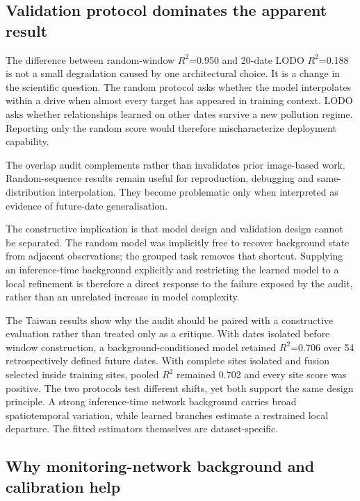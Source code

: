 \documentclass[review,12pt,authoryear]{elsarticle}
\newcommand{\Rtwo}{\ensuremath{R^2}}
\begin{document}
\subsection{Validation protocol dominates the apparent result}

The difference between random-window \Rtwo=0.950 and 20-date LODO
\Rtwo=0.188 is not a small degradation caused by one architectural choice. It
is a change in the scientific question. The random protocol asks whether the
model interpolates within a drive when almost every target has appeared in
training context. LODO asks whether relationships learned on other dates
survive a new pollution regime. Reporting only the random score would therefore
mischaracterize deployment capability.

The overlap audit complements rather than invalidates prior image-based work.
Random-sequence results remain useful for reproduction, debugging and
same-distribution interpolation. They become problematic only when interpreted
as evidence of future-date generalisation.

The constructive implication is that model design and validation design cannot
be separated. The random model was implicitly free to recover background state
from adjacent observations; the grouped task removes that shortcut. Supplying
an inference-time background explicitly and restricting the learned model to a
local refinement is therefore a direct response to the failure exposed by the
audit, rather than an unrelated increase in model complexity.

The Taiwan results show why the audit should be paired with a constructive
evaluation rather than treated only as a critique. With dates isolated before
window construction, a background-conditioned model retained
\Rtwo=0.706 over 54 retrospectively defined future dates. With complete sites isolated and fusion
selected inside training sites, pooled \Rtwo{} remained 0.702 and every site
score was positive. The two protocols test different shifts, yet both support
the same design principle. A strong inference-time network background carries
broad spatiotemporal variation, while learned branches estimate a restrained
local departure. The fitted estimators themselves are dataset-specific.

\subsection{Why monitoring-network background and calibration help}
\end{document}
